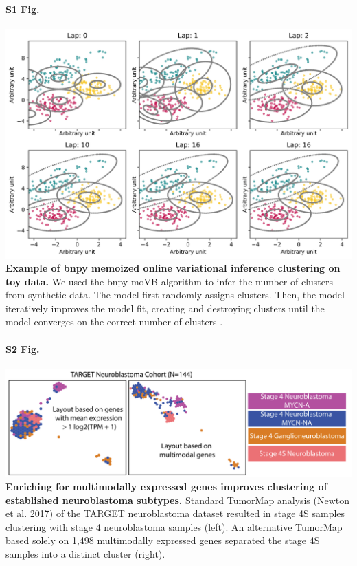\documentclass[10pt,letterpaper]{article}
\providecommand{\DIFaddbegin}{} %
\providecommand{\DIFaddend}{} %
\newcommand{\DIFaddincludegraphics}[2][]{{\color{blue}\fbox{\DIFOincludegraphics[#1]{#2}}}} %
\DeclareRobustCommand{\DIFaddbegin}{\DIFOaddbegin \let\includegraphics\DIFaddincludegraphics} %
\DeclareRobustCommand{\DIFaddend}{\DIFOaddend \let\includegraphics\DIFOincludegraphics} %
\begin{document}
\paragraph*{S1 Fig.}
\DIFaddbegin \includegraphics[width=\textwidth]{img/PNG/cluster-over-time}
\DIFaddend \label{S1_Fig}
{\bf Example of bnpy memoized online variational inference clustering on toy data.} We used the bnpy moVB algorithm to infer the number of clusters from synthetic data. The model first randomly assigns clusters. Then, the model iteratively improves the model fit, creating and destroying clusters until the model converges on the correct number of clusters \cite{hughesBnpyReliableScalable}. 

\paragraph*{S2 Fig.}
\DIFaddbegin \includegraphics[width=\textwidth]{img/PNG/TumorMap-NBL-MM-V3-2x}
\DIFaddend \label{S2_Fig}
{\bf Enriching for multimodally expressed genes improves clustering of established neuroblastoma subtypes.} Standard TumorMap analysis (Newton et al. 2017) of the TARGET neuroblastoma dataset resulted in stage 4S samples clustering with stage 4 neuroblastoma samples (left). An alternative TumorMap based solely on 1,498 multimodally expressed genes separated the stage 4S samples into a distinct cluster (right).
\end{document}
